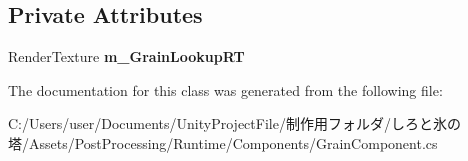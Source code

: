 \subsection*{Private Attributes}
\begin{DoxyCompactItemize}
\item 
\mbox{\label{class_unity_engine_1_1_post_processing_1_1_grain_component_a0550db3c0f4dbf113e22880bcf8b0d76}} 
Render\+Texture {\bfseries m\+\_\+\+Grain\+Lookup\+RT}
\end{DoxyCompactItemize}


The documentation for this class was generated from the following file\+:\begin{DoxyCompactItemize}
\item 
C\+:/\+Users/user/\+Documents/\+Unity\+Project\+File/制作用フォルダ/しろと氷の塔/\+Assets/\+Post\+Processing/\+Runtime/\+Components/Grain\+Component.\+cs\end{DoxyCompactItemize}
